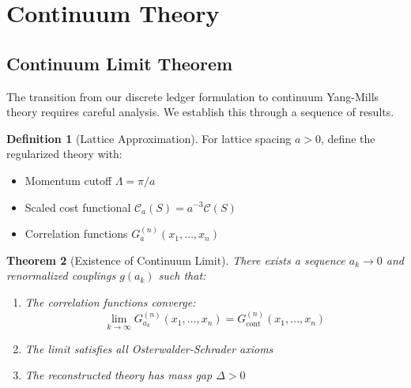 \documentclass[11pt]{article}
\numberwithin{equation}{section}
\newtheorem{theorem}{Theorem}[section]
\theoremstyle{definition}
\newtheorem{definition}[theorem]{Definition}
\theoremstyle{remark}
\begin{document}
\section{Continuum Theory}

\subsection{Continuum Limit Theorem}

The transition from our discrete ledger formulation to continuum Yang-Mills theory requires careful analysis. We establish this through a sequence of results.

\begin{definition}[Lattice Approximation]
For lattice spacing $a > 0$, define the regularized theory with:
\begin{itemize}
\item Momentum cutoff $\Lambda = \pi/a$
\item Scaled cost functional $\mathcal{C}_a(S) = a^{-3} \mathcal{C}(S)$
\item Correlation functions $G_a^{(n)}(x_1,\ldots,x_n)$
\end{itemize}
\end{definition}

\begin{theorem}[Existence of Continuum Limit]
\label{thm:continuum}
There exists a sequence $a_k \to 0$ and renormalized couplings $g(a_k)$ such that:
\begin{enumerate}
\item The correlation functions converge:
\begin{equation}
\lim_{k \to \infty} G_{a_k}^{(n)}(x_1,\ldots,x_n) = G^{(n)}_{\text{cont}}(x_1,\ldots,x_n)
\end{equation}
\item The limit satisfies all Osterwalder-Schrader axioms
\item The reconstructed theory has mass gap $\Delta > 0$
\end{enumerate}
\end{theorem}
\end{document}
